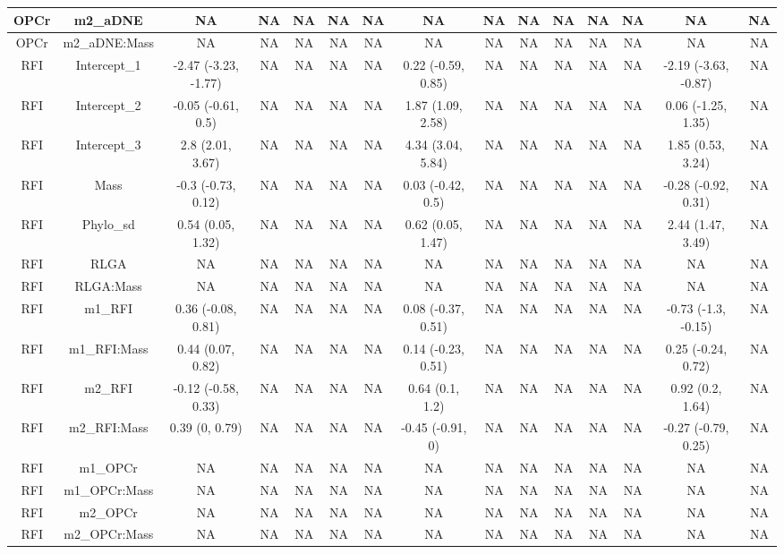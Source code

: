 \begin{longtable}[t]{c|c|c|c|c|c|c|c|c|c|c|c|c|c|c}
\hline
OPCr & m2_aDNE & NA & NA & NA & NA & NA & NA & NA & NA & NA & NA & NA & NA & NA\\
\hline
OPCr & m2_aDNE:Mass & NA & NA & NA & NA & NA & NA & NA & NA & NA & NA & NA & NA & NA\\
\hline
RFI & Intercept_1 & -2.47 (-3.23, -1.77) & NA & NA & NA & NA & 0.22 (-0.59, 0.85) & NA & NA & NA & NA & NA & -2.19 (-3.63, -0.87) & NA\\
\hline
RFI & Intercept_2 & -0.05 (-0.61, 0.5) & NA & NA & NA & NA & 1.87 (1.09, 2.58) & NA & NA & NA & NA & NA & 0.06 (-1.25, 1.35) & NA\\
\hline
RFI & Intercept_3 & 2.8 (2.01, 3.67) & NA & NA & NA & NA & 4.34 (3.04, 5.84) & NA & NA & NA & NA & NA & 1.85 (0.53, 3.24) & NA\\
\hline
RFI & Mass & -0.3 (-0.73, 0.12) & NA & NA & NA & NA & 0.03 (-0.42, 0.5) & NA & NA & NA & NA & NA & -0.28 (-0.92, 0.31) & NA\\
\hline
RFI & Phylo_sd & 0.54 (0.05, 1.32) & NA & NA & NA & NA & 0.62 (0.05, 1.47) & NA & NA & NA & NA & NA & 2.44 (1.47, 3.49) & NA\\
\hline
RFI & RLGA & NA & NA & NA & NA & NA & NA & NA & NA & NA & NA & NA & NA & NA\\
\hline
RFI & RLGA:Mass & NA & NA & NA & NA & NA & NA & NA & NA & NA & NA & NA & NA & NA\\
\hline
RFI & m1_RFI & 0.36 (-0.08, 0.81) & NA & NA & NA & NA & 0.08 (-0.37, 0.51) & NA & NA & NA & NA & NA & -0.73 (-1.3, -0.15) & NA\\
\hline
RFI & m1_RFI:Mass & 0.44 (0.07, 0.82) & NA & NA & NA & NA & 0.14 (-0.23, 0.51) & NA & NA & NA & NA & NA & 0.25 (-0.24, 0.72) & NA\\
\hline
RFI & m2_RFI & -0.12 (-0.58, 0.33) & NA & NA & NA & NA & 0.64 (0.1, 1.2) & NA & NA & NA & NA & NA & 0.92 (0.2, 1.64) & NA\\
\hline
RFI & m2_RFI:Mass & 0.39 (0, 0.79) & NA & NA & NA & NA & -0.45 (-0.91, 0) & NA & NA & NA & NA & NA & -0.27 (-0.79, 0.25) & NA\\
\hline
RFI & m1_OPCr & NA & NA & NA & NA & NA & NA & NA & NA & NA & NA & NA & NA & NA\\
\hline
RFI & m1_OPCr:Mass & NA & NA & NA & NA & NA & NA & NA & NA & NA & NA & NA & NA & NA\\
\hline
RFI & m2_OPCr & NA & NA & NA & NA & NA & NA & NA & NA & NA & NA & NA & NA & NA\\
\hline
RFI & m2_OPCr:Mass & NA & NA & NA & NA & NA & NA & NA & NA & NA & NA & NA & NA & NA\\

\end{longtable}
